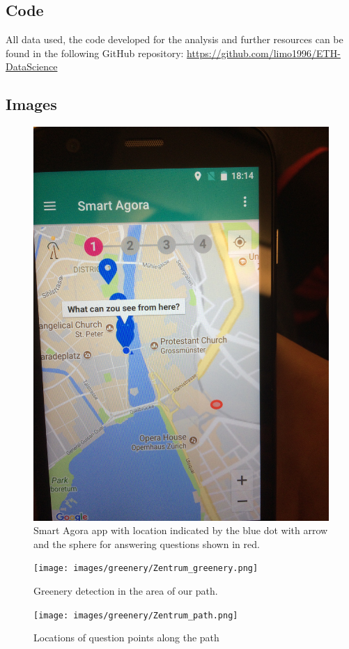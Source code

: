 \documentclass[letterpaper]{article}
\begin{document}
\subsection{Code}
All data used, the code developed for the analysis and further resources can be found in the following GitHub repository: \url{https://github.com/limo1996/ETH-DataScience}

\subsection{Images}
\begin{figure}[htb]
    \centering
    \includegraphics[width=\columnwidth, rotate=270]{images/SmartAgora/img_6.jpg}
    \caption{Smart Agora app with location indicated by the blue dot with arrow and the sphere for answering questions shown in red.}
    \label{fig:smart_agora_1}
\end{figure}

\begin{figure}[htb]
    \centering
    \texttt{[image: images/greenery/Zentrum\_greenery.png]}
    \caption{Greenery detection in the area of our path.}
    \label{fig:path_greenery}
\end{figure}

\begin{figure}[htb]
	\centering
	\texttt{[image: images/greenery/Zentrum\_path.png]}
	\caption{Locations of question points along the path}
	\label{fig:path_points}
\end{figure}
\end{document}
